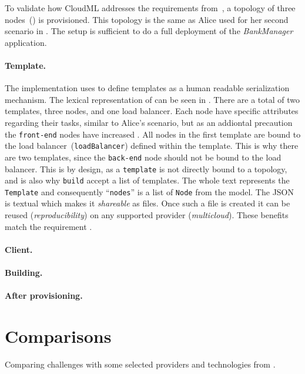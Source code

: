 
To validate how CloudML addresses the requirements from~,
a topology of three nodes~() is provisioned.
This topology is the same as Alice used for her second scenario in .
The setup is sufficient to do a full deployment of the \emph{BankManager} application.

\paragraph{Template.}


The implementation uses  to define templates as a human readable serialization mechanism.
The lexical representation of  can be seen in . 
There are a total of two templates, three nodes, and one load balancer.
Each node have specific attributes regarding their tasks, similar to Alice's scenario,
but as an addiontal precaution the \texttt{front-end} nodes have increased .
All nodes in the first template are bound to the load balancer~(\texttt{loadBalancer})
defined within the template.
This is why there are two templates, since the \texttt{back-end} node should not be bound to the load balancer.
This is by design, as a \texttt{template} is not directly bound to a topology,
and is also why \texttt{build} accept a list of templates.
The whole text represents the \texttt{Template} and consequently 
``\texttt{nodes}'' is a list of \texttt{Node} from the model.
The JSON is textual which makes it \emph{shareable} as files.
Once such a file is created it can be reused (\emph{reproducibility}) 
on any supported provider (\emph{multicloud}).
These benefits match the requirement .

\paragraph{Client.}


\paragraph{Building.}


\paragraph{After provisioning.}



\section{Comparisons}


Comparing challenges with some selected providers and technologies from .
